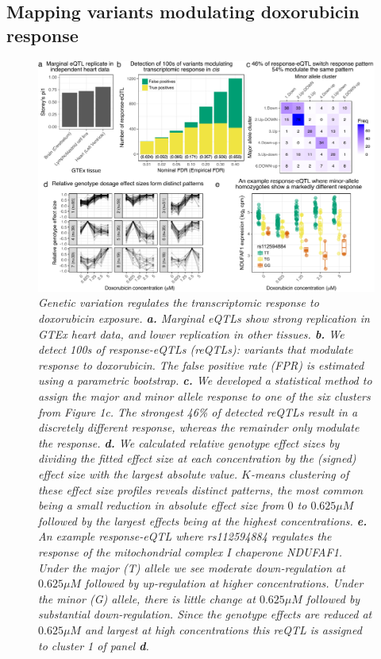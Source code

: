 \documentclass{article}
\begin{document}
\subsection*{Mapping variants modulating doxorubicin response}

\begin{figure}
\begin{center}
    \includegraphics[width=1\textwidth]{../figures/fig2.pdf}     \caption{\it{Genetic variation regulates the transcriptomic response to doxorubicin exposure. \textbf{a.} Marginal eQTLs show strong replication in GTEx heart data, and lower replication in other tissues. \textbf{b.} We detect 100s of response-eQTLs (reQTLs): variants that modulate response to doxorubicin. The false positive rate (FPR) is estimated using a parametric bootstrap. \textbf{c.} We developed a statistical method to assign the major and minor allele response to one of the six clusters from Figure 1c. The strongest 46\% of detected reQTLs result in a discretely different response, whereas the remainder only modulate the response. \textbf{d.} We calculated relative genotype effect sizes by dividing the fitted effect size at each concentration by the (signed) effect size with the largest absolute value. $K$-means clustering of these effect size profiles reveals distinct patterns, the most common being a small reduction in absolute effect size from $0$ to $0.625\mu M$ followed by the largest effects being at the highest concentrations. \textbf{e.} An example response-eQTL where rs112594884 regulates the response of the mitochondrial complex I chaperone NDUFAF1. Under the major (T) allele we see moderate down-regulation at $0.625\mu M$ followed by up-regulation at higher concentrations. Under the minor (G) allele, there is little change at $0.625\mu M$ followed by substantial down-regulation. Since the genotype effects are reduced at $0.625\mu M$ and largest at high concentrations this reQTL is assigned to cluster 1 of panel \textbf{d}.}}
    \label{fig2}
    \end{center}
\end{figure}
\end{document}
